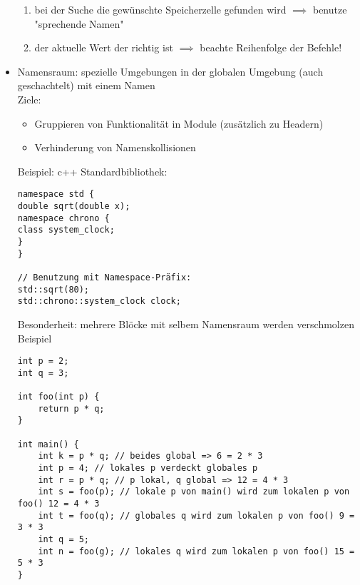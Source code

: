 \documentclass[a4paper]{scrartcl}
\theoremstyle{definition}
\theoremstyle{plain}
\theoremstyle{remark}
\theoremstyle{remark}
\begin{document}
\begin{itemize}
\begin{enumerate}
\item bei der Suche die gewünschte Speicherzelle gefunden wird $\implies$ benutze "sprechende Namen"
\item der aktuelle Wert der richtig ist $\implies$ beachte Reihenfolge der Befehle!
\end{enumerate}
\item Namensraum: spezielle Umgebungen in der globalen Umgebung (auch geschachtelt) mit einem Namen \\
        Ziele:
\begin{itemize}
\item Gruppieren von Funktionalität in Module (zusätzlich zu Headern)
\item Verhinderung von Namenskollisionen
\end{itemize}
Beispiel: c++ Standardbibliothek:
\begin{verbatim}
namespace std {
double sqrt(double x);
namespace chrono {
class system_clock;
}
}

// Benutzung mit Namespace-Präfix:
std::sqrt(80);
std::chrono::system_clock clock;
\end{verbatim}
     Besonderheit: mehrere Blöcke mit selbem Namensraum werden verschmolzen
Beispiel
\begin{verbatim}
int p = 2;
int q = 3;

int foo(int p) {
	return p * q;
}

int main() {
	int k = p * q; // beides global => 6 = 2 * 3
	int p = 4; // lokales p verdeckt globales p
	int r = p * q; // p lokal, q global => 12 = 4 * 3
	int s = foo(p); // lokale p von main() wird zum lokalen p von foo() 12 = 4 * 3
	int t = foo(q); // globales q wird zum lokalen p von foo() 9 = 3 * 3
	int q = 5;
	int n = foo(g); // lokales q wird zum lokalen p von foo() 15 = 5 * 3
}
\end{verbatim}
\end{itemize}
\end{document}
